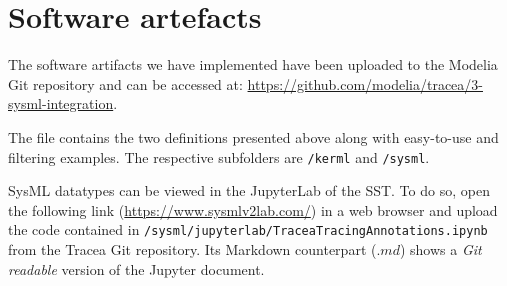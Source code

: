 \section{Software artefacts}\label{sec:artefacts}
The software artifacts we have implemented have been uploaded to the Modelia Git repository and can be accessed at:
\url{https://github.com/modelia/tracea/3-sysml-integration}.

The file contains the two definitions presented above along with easy-to-use and filtering examples. The respective subfolders are \verb|/kerml| and \verb|/sysml|.

SysML datatypes can be viewed in the JupyterLab of the SST. To do so, open the following link (\url{https://www.sysmlv2lab.com/}) in a web browser  and upload the code contained in \verb|/sysml/jupyterlab/TraceaTracingAnnotations.ipynb| from the Tracea Git repository. Its Markdown counterpart ($.md$) shows a \textit{Git readable} version of the Jupyter document.